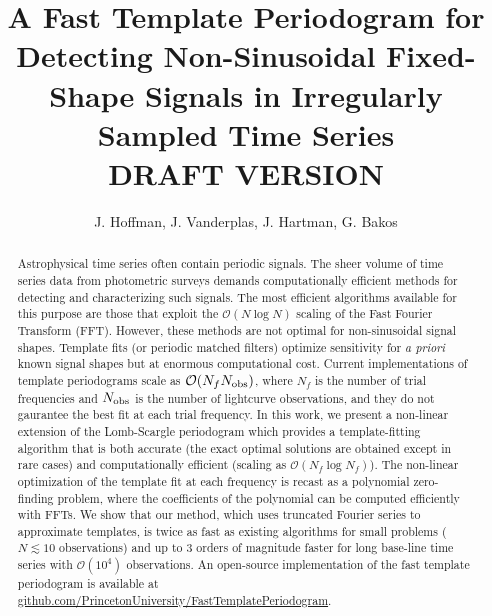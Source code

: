 \documentclass[apj]{emulateapj}
\newcommand{\bigO}{\mathcal{O}}
\begin{document}
\title{A Fast Template Periodogram for Detecting Non-Sinusoidal Fixed-Shape Signals in Irregularly Sampled Time Series\\
         DRAFT VERSION \versioninfo }

\author{J. Hoffman,
J. Vanderplas,
J. Hartman,
G. Bakos}


\begin{abstract}

    Astrophysical time series often contain periodic signals. The sheer volume of time series data from 
    photometric surveys demands computationally efficient methods for detecting and characterizing such signals. 
    The most efficient algorithms available for this purpose are those that exploit the 
    $\bigO(N\log N)$ scaling of the Fast Fourier Transform (FFT). However, these methods are not optimal 
    for non-sinusoidal signal shapes. Template fits (or periodic matched filters) optimize 
    sensitivity for \emph{a priori} known signal shapes but at enormous computational cost. Current 
    implementations of template periodograms scale as $\bigO(N_f N_{\rm obs})$, where $N_f$ is the number 
    of trial frequencies and $N_{\rm obs}$ is the number of lightcurve observations, and they do not 
    gaurantee the best fit at each trial frequency. In this work, we present a non-linear extension of the Lomb-Scargle 
    periodogram which provides a template-fitting algorithm that is both accurate (the exact optimal solutions are
    obtained except in rare cases) and computationally efficient (scaling as $\bigO(N_f\log N_f)$). 
    The non-linear optimization of the template fit at each frequency is recast as a polynomial 
    zero-finding problem, where the coefficients of the polynomial can be computed efficiently with
    FFTs. We show that our method, which uses truncated Fourier series to approximate templates, 
    is twice as fast as existing algorithms for small problems ($N\lesssim 10$ observations) and
    up to 3 orders of magnitude faster for long base-line time series with $\bigO(10^4)$ observations.
    An open-source implementation of the fast template periodogram is available at 
    \href{https://www.github.com/PrincetonUniversity/FastTemplatePeriodogram}{github.com/PrincetonUniversity/FastTemplatePeriodogram}. 
\end{abstract}
\end{document}

